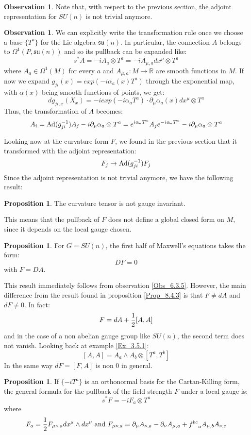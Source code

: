 \documentclass[12pt,a4paper]{report}
\theoremstyle{definition}
\theoremstyle{Theorem}
\newtheorem{Prop}[Def]{Proposition}
\theoremstyle{definition}
\theoremstyle{definition}
\newtheorem{Obs}[Def]{Observation}
\begin{document}
	\begin{Obs}
		Note that, with respect to the previous section, the adjoint representation for $SU(n)$ is not trivial anymore.
	\end{Obs}
	\begin{Obs}
		We can explicitly write the transformation rule once we choose a base $\{T^a\}$ for the Lie algebra $\mathfrak{su}(n)$. In particular, the connection $A$ belongs to $\Omega^1(P,\mathfrak{su}(n))$ and so its pullback can be expanded like:
		$$s^*A=-iA_a\otimes T^a=-iA_{\mu,a}dx^\mu\otimes T^a$$
		where $A_a\in\Omega^1(M)$ for every $a$ and $A_{\mu,a}:M\rightarrow\mathbb{R}$ are smooth functions in $M$. 
		If now we expand $g_{ji}(x)=exp(-i\alpha_a(x)T^a)$ through the exponential map, with $\alpha(x)$ being smooth functions of points, we get:
		$$dg_{ji,x}(X_x)=-iexp(-i\alpha_aT^a)\cdot \partial_\mu \alpha_{a}(x)dx^\mu\otimes T^a$$
		Thus, the transformation of $A$ becomes:
		$$A_i=\hbox{Ad}(g_{ji}^{-1})A_j-i\partial_\mu\alpha_a\otimes T^a=e^{i\alpha_aT^a}A_je^{-i\alpha_aT^a}-i\partial_\mu\alpha_a\otimes T^a$$
	\end{Obs}
	Looking now at the curvature form $F$, we found in the previous section that it transformed with the adjoint representation:
	$$F_j\rightarrow \hbox{Ad}(g_{ji}^{-1})F_j$$ 
	Since the adjoint representation is not trivial anymore, we have the following result:
	\begin{Prop}
		The curvature tensor is not gauge invariant.
	\end{Prop}
	This means that the pullback of $F$ does not define a global closed form on $M$, since it depends on the local gauge chosen.
	\begin{Prop}
		For $G=SU(n)$, the first half of Maxwell's equations takes the form:
		$$DF=0$$
		with $F=DA$.
	\end{Prop}
	This result immediately follows from observation \ref{Obs_6.3.5}. However, the main difference from the result found in proposition \ref{Prop_8.4.3} is that $F\neq dA$ and $dF\neq 0$. In fact:
	$$F=dA+{1\over 2}[A,A]$$
	and in the case of a non abelian gauge group like $SU(n)$, the second term does not vanish. Looking back at example \ref{Ex_3.5.1}:
	$$[A,A]=A_a\wedge A_b \otimes [T^a,T^b]$$ 
	In the same way $dF=[F,A]$ is non 0 in general.
	\begin{Prop}
		If $\{-iT^a\}$ is an orthonormal basis for the Cartan-Killing form, the general formula for the pullback of the field strength $F$ under a local gauge is:
		$$s^*F=-iF_{a}\otimes T^a$$
		where 
		$$F_a={1\over 2}F_{\mu\nu,a}dx^\mu\wedge dx^\nu \hbox{ and }F_{\mu\nu,a}=\partial_\mu A_{\nu,a}-\partial_\nu A_{\mu,a}+f^{bc}_{\hspace{9pt}a}A_{\mu,b}A_{\nu,c}$$
	\end{Prop}
\end{document}
